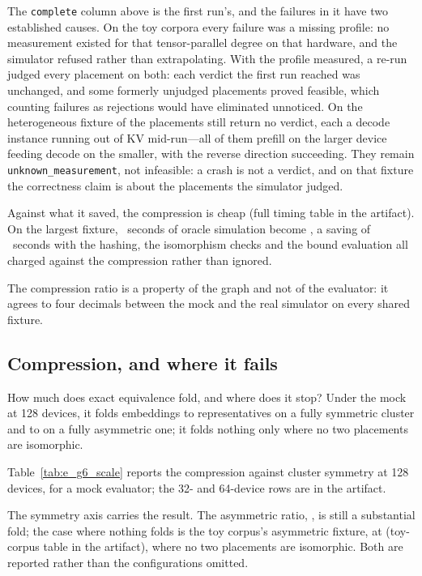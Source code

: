 The \texttt{complete} column above is the first run's, and the failures in it
have two established causes. %
On the toy corpora every failure was a missing profile: no measurement existed
for that tensor-parallel degree on that hardware, and the simulator refused
rather than extrapolating. With the profile measured, a re-run judged every
placement on both: each verdict the first run reached was unchanged, and some
formerly unjudged placements proved feasible, which counting failures as
rejections would have eliminated unnoticed. On the heterogeneous fixture
\egthreeUnjudgedLab{} of the \egthreeEmbeddingsLab{} placements still return
no verdict, each a decode instance running out of KV mid-run---all of them
prefill on the larger device feeding decode on the smaller, with the reverse
direction succeeding. They remain \texttt{unknown\_measurement}, not
infeasible: a crash is not a verdict, and on that fixture the correctness claim
is about the placements the simulator judged.

Against what it saved, the compression is cheap (full timing table in the
artifact). On the largest fixture, \egthreeSimOracleAbcde~seconds
of oracle simulation become \egthreeSimProposedAbcde, a saving of
\egthreeSavingAbcde~seconds with the hashing, the isomorphism checks and the
bound evaluation all charged against the compression rather than ignored.

The compression ratio is a property of the graph and not of the evaluator: it
agrees to four decimals between the mock and the real simulator on every shared
fixture.

\subsection{Compression, and where it fails}

How much does exact equivalence fold, and where does it stop? Under the mock at
128 devices, it folds \egsixEmbeddingsLarge{} embeddings to \egsixRepsSym{}
representatives on a fully symmetric cluster and to \egsixRepsAsym{} on a fully
asymmetric one; it folds nothing only where no two placements are isomorphic.



Table~\ref{tab:e_g6_scale} reports the compression against cluster symmetry
at 128 devices, for a mock evaluator; the 32- and 64-device rows are in the
artifact.

The symmetry axis carries the result. The asymmetric ratio, \egsixRatioAsym, is still a substantial fold; the case
where nothing folds is the toy corpus's asymmetric fixture, at
\egoneRatioAsym{} (toy-corpus table in the artifact), where no two placements
are isomorphic. Both are reported rather than the configurations omitted.

